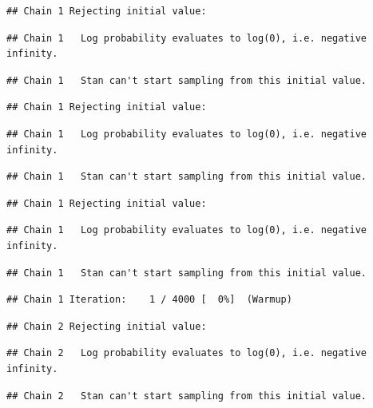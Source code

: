 \documentclass[
]{article}
\begin{document}
\begin{verbatim}
## Chain 1 Rejecting initial value:
\end{verbatim}

\begin{verbatim}
## Chain 1   Log probability evaluates to log(0), i.e. negative infinity.
\end{verbatim}

\begin{verbatim}
## Chain 1   Stan can't start sampling from this initial value.
\end{verbatim}

\begin{verbatim}
## Chain 1 Rejecting initial value:
\end{verbatim}

\begin{verbatim}
## Chain 1   Log probability evaluates to log(0), i.e. negative infinity.
\end{verbatim}

\begin{verbatim}
## Chain 1   Stan can't start sampling from this initial value.
\end{verbatim}

\begin{verbatim}
## Chain 1 Rejecting initial value:
\end{verbatim}

\begin{verbatim}
## Chain 1   Log probability evaluates to log(0), i.e. negative infinity.
\end{verbatim}

\begin{verbatim}
## Chain 1   Stan can't start sampling from this initial value.
\end{verbatim}

\begin{verbatim}
## Chain 1 Iteration:    1 / 4000 [  0%]  (Warmup)
\end{verbatim}

\begin{verbatim}
## Chain 2 Rejecting initial value:
\end{verbatim}

\begin{verbatim}
## Chain 2   Log probability evaluates to log(0), i.e. negative infinity.
\end{verbatim}

\begin{verbatim}
## Chain 2   Stan can't start sampling from this initial value.
\end{verbatim}
\end{document}
